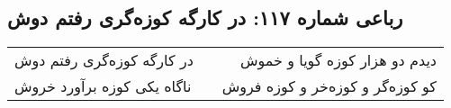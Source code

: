 \begin{center}
\section*{رباعی شماره ۱۱۷: در کارگه کوزه‌گری رفتم دوش}
\label{sec:sh117}
\begin{longtable}{l p{0.5cm} r}
در کارگه کوزه‌گری رفتم دوش
&&
دیدم دو هزار کوزه گویا و خموش
\\
ناگاه یکی کوزه برآورد خروش
&&
کو کوزه‌گر و کوزه‌خر و کوزه فروش
\\
\end{longtable}
\end{center}
